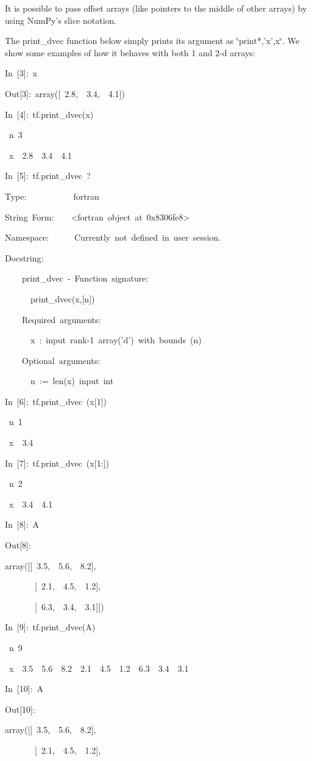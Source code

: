 It is possible to pass offset arrays (like pointers to the middle
of other arrays) by using NumPy's slice notation.

The print\_dvec function below simply prints its argument as \char`\"{}print{*},'x',x\char`\"{}.
We show some examples of how it behaves with both 1 and 2-d arrays: 

\begin{lyxcode}
In~{[}3]:~x

Out{[}3]:~array({[}~2.8,~~3.4,~~4.1])

In~{[}4]:~tf.print\_dvec(x)

~n~3

~x~~2.8~~3.4~~4.1

In~{[}5]:~tf.print\_dvec~?

Type:~~~~~~~~~~~fortran

String~Form:~~~~<fortran~object~at~0x8306fe8>

Namespace:~~~~~~Currently~not~defined~in~user~session.

Docstring:

~~~~print\_dvec~-~Function~signature:

~~~~~~print\_dvec(x,{[}n])

~~~~Required~arguments:

~~~~~~x~:~input~rank-1~array('d')~with~bounds~(n)

~~~~Optional~arguments:

~~~~~~n~:=~len(x)~input~int

In~{[}6]:~tf.print\_dvec~(x{[}1])

~n~1

~x~~3.4

In~{[}7]:~tf.print\_dvec~(x{[}1:])

~n~2

~x~~3.4~~4.1

In~{[}8]:~A

Out{[}8]:

array({[}{[}~3.5,~~5.6,~~8.2],

~~~~~~~{[}~2.1,~~4.5,~~1.2],

~~~~~~~{[}~6.3,~~3.4,~~3.1]])

In~{[}9]:~tf.print\_dvec(A)

~n~9

~x~~3.5~~5.6~~8.2~~2.1~~4.5~~1.2~~6.3~~3.4~~3.1

In~{[}10]:~A

Out{[}10]:

array({[}{[}~3.5,~~5.6,~~8.2],

~~~~~~~{[}~2.1,~~4.5,~~1.2],


\end{lyxcode}
